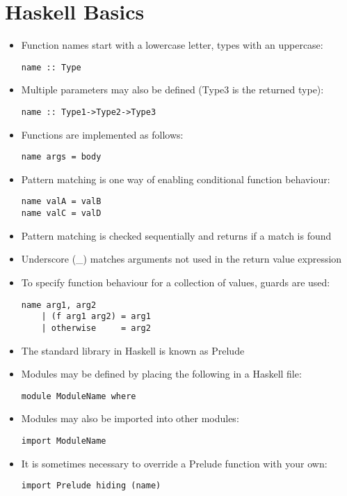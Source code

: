 \documentclass{article}
\begin{document}
\section{Haskell Basics}

\begin{itemize}
\item Function names start with a lowercase letter, types with an uppercase:
\begin{lstlisting}
name :: Type
\end{lstlisting}
\item Multiple parameters may also be defined (Type3 is the returned type):
\begin{lstlisting}
name :: Type1->Type2->Type3
\end{lstlisting}
\item Functions are implemented as follows:
\begin{lstlisting}
name args = body
\end{lstlisting}
\item Pattern matching is one way of enabling conditional function behaviour:
\begin{lstlisting}
name valA = valB
name valC = valD
\end{lstlisting}
\item Pattern matching is checked sequentially and returns if a match is found
\item Underscore (\_) matches arguments not used in the return value expression
\item To specify function behaviour for a collection of values, guards are used:
\begin{lstlisting}
name arg1, arg2
	| (f arg1 arg2)	= arg1
	| otherwise		= arg2
\end{lstlisting}
\item The standard library in Haskell is known as Prelude
\item Modules may be defined by placing the following in a Haskell file:
\begin{lstlisting}
module ModuleName where
\end{lstlisting}
\item Modules may also be imported into other modules:
\begin{lstlisting}
import ModuleName
\end{lstlisting}
\item It is sometimes necessary to override a Prelude function with your own:
\begin{lstlisting}
import Prelude hiding (name)
\end{lstlisting}

\end{itemize}
\end{document}
